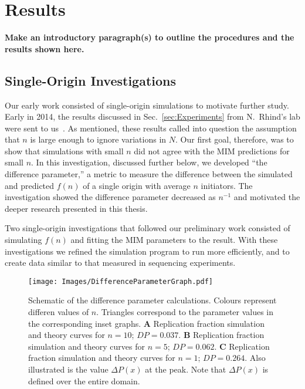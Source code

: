 \chapter{Results}
\label{Ch:Results}

\textbf{Make an introductory paragraph(s) to outline the procedures and the results shown here.}

	\section{Single-Origin Investigations}
	\label{sec:SingleOrigin}
	
	Our early work consisted of single-origin simulations to motivate further study.
	Early in 2014, the results discussed in Sec.~\ref{sec:Experiments} from N.~Rhind's lab were sent to us~\cite{Rhind}.
	As mentioned, these results called into question the assumption that $n$ is large enough to ignore variations in $N$.
	Our first goal, therefore, was to show that simulations with small $n$ did not agree with the MIM predictions for small $n$.
	In this investigation, discussed further below, we developed ``the difference parameter,'' a metric to measure the difference between the simulated and predicted $f(n)$ of a single origin with average $n$ initiators.
	The investigation showed the difference parameter decreased as $n^{-1}$ and motivated the deeper research presented in this thesis.
	
	Two single-origin investigations that followed our preliminary work consisted of simulating $f(n)$ and fitting the MIM parameters to the result.
	With these investigations we refined the simulation program to run more efficiently, and to create data similar to that measured in sequencing experiments.
		
	\begin{figure}[tbh!]
		\begin{center}
			\texttt{[image: Images/DifferenceParameterGraph.pdf]}
		\end{center}
			\caption[Difference Parameter]{\label{fig:DifferenceParameter} Schematic of the difference parameter calculations.
				Colours represent differen values of $n$. Triangles correspond to the parameter values in the corresponding inset graphs.
				\textbf{A} Replication fraction simulation and theory curves for $n=10$; $DP=0.037$.
				\textbf{B} Replication fraction simulation and theory curves for $n=5$; $DP = 0.062$.
				\textbf{C} Replication fraction simulation and theory curves for $n=1$; $DP = 0.264$.
				Also illustrated is the value $\Delta P(x)$ at the peak.
				Note that $\Delta P(x)$ is defined over the entire domain.
				}
	\end{figure}
	
